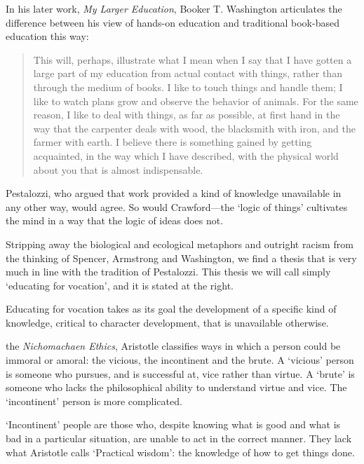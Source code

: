 In his later work, \emph{My Larger Education}, Booker T. Washington articulates the difference between his view of hands-on education and traditional book-based education this way:

\begin{quote}

This will, perhaps, illustrate what I mean when I say that I have gotten a large part of my education from actual contact with things, rather than through the medium of books. I like to touch things and handle them; I like to watch plans grow and observe the behavior of animals. For the same reason, I like to deal with things, as far as possible, at first hand in the way that the carpenter deals with wood, the blacksmith with iron, and the farmer with earth. I believe there is something gained by getting acquainted, in the way which I have described, with the physical world about you that is almost indispensable. ~\citep[P. 9--10]{Washington:1911wz}
\end{quote}

Pestalozzi, who argued that work provided a kind of knowledge unavailable in any other way, would agree. So would Crawford---the `logic of things' cultivates the mind in a way that the logic of ideas does not.

Stripping away the biological and ecological metaphors and outright racism from the thinking of Spencer, Armstrong and Washington, we find a thesis that is very much in line with the tradition of Pestalozzi. This thesis we will call simply `educating for vocation', and it is stated at the right.
\begin{purpose}\label{def:forvocation}
Educating for vocation takes as its goal the development of a specific kind of knowledge, critical to character development, that is unavailable otherwise.
\end{purpose} 

 the \emph{Nichomachaen Ethics}, Aristotle classifies ways in which a person could be immoral or amoral: the vicious, the incontinent and the brute. A `vicious' person is someone who pursues, and is successful at, vice rather than virtue. A `brute' is someone who lacks the philosophical ability to understand virtue and vice. The `incontinent' person is more complicated. 

`Incontinent' people are those who, despite knowing what is good and what is bad in a particular situation, are unable to act in the correct manner. They lack what Aristotle calls `Practical wisdom': the knowledge of how to get things done. 

